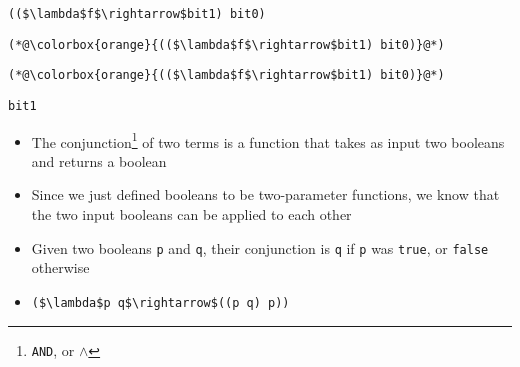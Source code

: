 \documentclass{beamer}
\begin{document}
\begin{frame}[fragile]{\CurrentSection}
\lstset{basicstyle=\ttfamily\small}\lstset{numbers=none}\lstset{language=ML}\begin{lstlisting}
(($\lambda$f$\rightarrow$bit1) bit0)
\end{lstlisting}
\pause\lstset{language=ML}\begin{lstlisting}
(*@\colorbox{orange}{(($\lambda$f$\rightarrow$bit1) bit0)}@*)
\end{lstlisting}

\end{frame}

\begin{frame}[fragile]{\CurrentSection}
\lstset{basicstyle=\ttfamily\small}\lstset{numbers=none}\lstset{language=ML}\begin{lstlisting}
(*@\colorbox{orange}{(($\lambda$f$\rightarrow$bit1) bit0)}@*)
\end{lstlisting}
\pause\lstset{language=ML}\begin{lstlisting}
bit1
\end{lstlisting}

\end{frame}

\begin{frame}[fragile]{\CurrentSection}
\begin{block}{\CurrentSubSection}
\begin{itemize}
\item The conjunction\footnote{\texttt{AND}, or $\wedge$} of two terms is a function that takes as input two booleans and returns a boolean
\item Since we just defined booleans to be two-parameter functions, we know that the two input booleans can be applied to each other
\item Given two booleans \texttt{p} and \texttt{q}, their conjunction is \texttt{q} if \texttt{p} was \texttt{true}, or \texttt{false} otherwise
\item \lstset{basicstyle=\ttfamily\small}\lstset{numbers=none}\lstset{language=ML}\begin{lstlisting}
($\lambda$p q$\rightarrow$((p q) p))
\end{lstlisting}


\end{itemize}

\end{block}


\end{frame}
\end{document}
